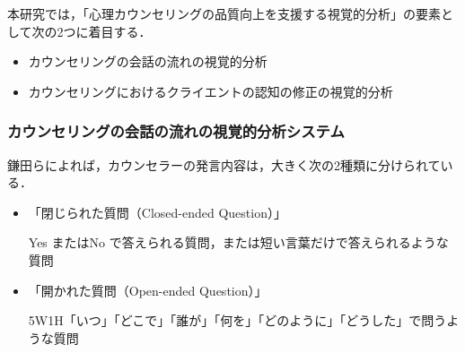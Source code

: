 \documentclass[shuuron]{kuee}
\begin{document}
%



本研究では，「心理カウンセリングの品質向上を支援する視覚的分析」の要素として次の2つに着目する．
\begin{itemize}
  \item %
  カウンセリングの会話の流れの視覚的分析%
  \item カウンセリングにおけるクライエントの認知の修正の視覚的分析
\end{itemize}



\subsubsection{カウンセリングの会話の流れの視覚的分析システム}


鎌田ら\cite{Darshana}によれば，カウンセラーの発言内容は，大きく次の2種類に分けられている．%
\begin{itemize}
  \item 「閉じられた質問（Closed-ended Question）」

  Yes またはNo で答えられる質問，または短い言葉だけで答えられるような質問
  \item 「開かれた質問（Open-ended Question）」

  5W1H「いつ」「どこで」「誰が」「何を」「どのように」「どうした」で問うような質問

\end{itemize}
\end{document}
